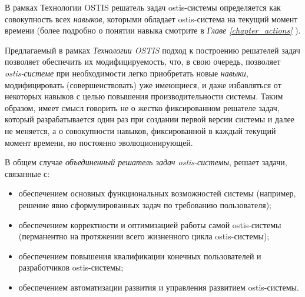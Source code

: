 В рамках Технологии OSTIS решатель задач ostis-системы определяется как совокупность всех \textit{навыков}, которыми обладает ostis-система на текущий момент времени (более подробно о понятии навыка смотрите в \textit{Главе \ref{chapter_actions} }).

Предлагаемый в рамках \textit{Технологии OSTIS} подход к построению решателей задач позволяет обеспечить их модифицируемость, что, в свою очередь, позволяет \textit{ostis-системе} при необходимости легко приобретать новые \textit{навыки}, модифицировать (совершенствовать) уже имеющиеся, и даже избавляться от некоторых навыков с целью повышения производительности системы. Таким образом, имеет смысл говорить не о жестко фиксированном решателе задач, который разрабатывается один раз при создании первой версии системы и далее не меняется, а о совокупности навыков, фиксированной в каждый текущий момент времени, но постоянно эволюционирующей.


\begin{SCn}
\begin{scnindent}
\end{scnindent}
\begin{scnindent}
\end{scnindent}
\end{SCn}

В общем случае \textit{объединенный решатель задач ostis-системы}, решает задачи, связанные с:
	\begin{itemize}
		\item обеспечением основных функциональных возможностей системы (например, решение явно сформулированных задач по требованию пользователя);
		\item обеспечением корректности и оптимизацией работы самой ostis-системы (перманентно на протяжении всего жизненного цикла ostis-системы);
		\item обеспечением повышения квалификации конечных пользователей и разработчиков ostis-системы;
		\item обеспечением автоматизации развития и управления развитием ostis-системы.
\end{itemize}

